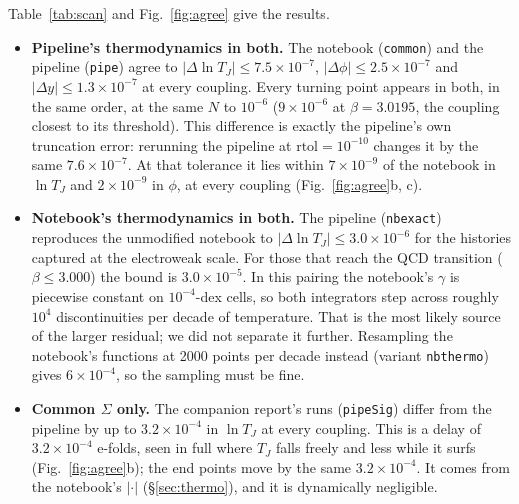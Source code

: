 \documentclass[11pt,a4paper]{article}
\newcommand{\TJ}{T_{J}}
\newcommand{\code}[1]{\texttt{#1}}
\begin{document}
Table~\ref{tab:scan} and Fig.~\ref{fig:agree} give the results.
\begin{itemize}
\item \textbf{Pipeline's thermodynamics in both.} The notebook (\code{common}) and the pipeline
  (\code{pipe}) agree to $|\Delta\ln\TJ| \le 7.5\times10^{-7}$, $|\Delta\phi| \le 2.5\times10^{-7}$
  and $|\Delta y| \le 1.3\times10^{-7}$ at every coupling. Every turning point appears in both,
  in the same order, at the same $N$ to $10^{-6}$ ($9\times10^{-6}$ at $\beta = 3.0195$, the
  coupling closest to its threshold). This difference is exactly the pipeline's own truncation
  error: rerunning the pipeline at $\mathrm{rtol} = 10^{-10}$ changes it by the same
  $7.6\times10^{-7}$. At that tolerance it lies within $7\times10^{-9}$ of the notebook in
  $\ln\TJ$ and $2\times10^{-9}$ in $\phi$, at every coupling (Fig.~\ref{fig:agree}b, c).
\item \textbf{Notebook's thermodynamics in both.} The pipeline (\code{nbexact}) reproduces the
  unmodified notebook to $|\Delta\ln\TJ| \le 3.0\times10^{-6}$ for the histories captured at the
  electroweak scale. For those that reach the QCD transition ($\beta \le 3.000$) the bound is
  $3.0\times10^{-5}$. In this pairing the notebook's $\gamma$ is piecewise constant on
  $10^{-4}$-dex cells, so both integrators step across roughly $10^4$ discontinuities per
  decade of temperature. That is the most likely source of the larger residual; we did not
  separate it further. Resampling the notebook's functions at 2000 points per decade instead
  (variant \code{nbthermo}) gives $6\times10^{-4}$, so the sampling must be fine.
\item \textbf{Common $\Sigma$ only.} The companion report's runs (\code{pipeSig}) differ from
  the pipeline by up to $3.2\times10^{-4}$ in $\ln\TJ$ at every coupling. This is a delay of
  $3.2\times10^{-4}$ e-folds, seen in full where $\TJ$ falls freely and less while it surfs
  (Fig.~\ref{fig:agree}b); the end points move by the same $3.2\times10^{-4}$. It comes from the
  notebook's $|\cdot|$ (\S\ref{sec:thermo}), and it is dynamically negligible.
\end{itemize}
\end{document}
